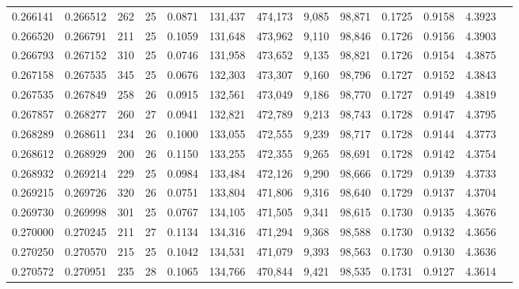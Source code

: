 \begin{tabular}{rrrrrrrrrrrrr}
0.266141 & 0.266512 &   262 &  25 &                                     0.0871 & 131,437 & 474,173 &   9,085 &  98,871 & 0.1725 & 0.9158 & 4.3923 \\
0.266520 & 0.266791 &   211 &  25 &                                     0.1059 & 131,648 & 473,962 &   9,110 &  98,846 & 0.1726 & 0.9156 & 4.3903 \\
0.266793 & 0.267152 &   310 &  25 &                                     0.0746 & 131,958 & 473,652 &   9,135 &  98,821 & 0.1726 & 0.9154 & 4.3875 \\
0.267158 & 0.267535 &   345 &  25 &                                     0.0676 & 132,303 & 473,307 &   9,160 &  98,796 & 0.1727 & 0.9152 & 4.3843 \\
0.267535 & 0.267849 &   258 &  26 &                                     0.0915 & 132,561 & 473,049 &   9,186 &  98,770 & 0.1727 & 0.9149 & 4.3819 \\
0.267857 & 0.268277 &   260 &  27 &                                     0.0941 & 132,821 & 472,789 &   9,213 &  98,743 & 0.1728 & 0.9147 & 4.3795 \\
0.268289 & 0.268611 &   234 &  26 &                                     0.1000 & 133,055 & 472,555 &   9,239 &  98,717 & 0.1728 & 0.9144 & 4.3773 \\
0.268612 & 0.268929 &   200 &  26 &                                     0.1150 & 133,255 & 472,355 &   9,265 &  98,691 & 0.1728 & 0.9142 & 4.3754 \\
0.268932 & 0.269214 &   229 &  25 &                                     0.0984 & 133,484 & 472,126 &   9,290 &  98,666 & 0.1729 & 0.9139 & 4.3733 \\
0.269215 & 0.269726 &   320 &  26 &                                     0.0751 & 133,804 & 471,806 &   9,316 &  98,640 & 0.1729 & 0.9137 & 4.3704 \\
0.269730 & 0.269998 &   301 &  25 &                                     0.0767 & 134,105 & 471,505 &   9,341 &  98,615 & 0.1730 & 0.9135 & 4.3676 \\
0.270000 & 0.270245 &   211 &  27 &                                     0.1134 & 134,316 & 471,294 &   9,368 &  98,588 & 0.1730 & 0.9132 & 4.3656 \\
0.270250 & 0.270570 &   215 &  25 &                                     0.1042 & 134,531 & 471,079 &   9,393 &  98,563 & 0.1730 & 0.9130 & 4.3636 \\
0.270572 & 0.270951 &   235 &  28 &                                     0.1065 & 134,766 & 470,844 &   9,421 &  98,535 & 0.1731 & 0.9127 & 4.3614 \\

\end{tabular}
